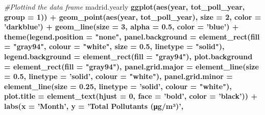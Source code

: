 \documentclass[
]{article}
\newenvironment{Shaded}{\begin{snugshade}}{\end{snugshade}}
\newcommand{\CommentTok}[1]{\textcolor[rgb]{0.56,0.35,0.01}{\textit{#1}}}
\newcommand{\DataTypeTok}[1]{\textcolor[rgb]{0.13,0.29,0.53}{#1}}
\newcommand{\DecValTok}[1]{\textcolor[rgb]{0.00,0.00,0.81}{#1}}
\newcommand{\FloatTok}[1]{\textcolor[rgb]{0.00,0.00,0.81}{#1}}
\newcommand{\KeywordTok}[1]{\textcolor[rgb]{0.13,0.29,0.53}{\textbf{#1}}}
\newcommand{\NormalTok}[1]{#1}
\newcommand{\OperatorTok}[1]{\textcolor[rgb]{0.81,0.36,0.00}{\textbf{#1}}}
\newcommand{\StringTok}[1]{\textcolor[rgb]{0.31,0.60,0.02}{#1}}
\begin{document}
\begin{Shaded}
\begin{Highlighting}[]
{{{\CommentTok{#Plottind the data frame}
\NormalTok{madrid.yearly }\OperatorTok{%>%}
\StringTok{  }\KeywordTok{ggplot}\NormalTok{(}\KeywordTok{aes}\NormalTok{(year, tot_poll_year, }\DataTypeTok{group =} \DecValTok{1}\NormalTok{)) }\OperatorTok{+}\StringTok{ }
\StringTok{    }\KeywordTok{geom_point}\NormalTok{(}\KeywordTok{aes}\NormalTok{(year, tot_poll_year), }\DataTypeTok{size =} \DecValTok{2}\NormalTok{, }\DataTypeTok{color =} \StringTok{'darkblue'}\NormalTok{) }\OperatorTok{+}\StringTok{ }
\StringTok{    }\KeywordTok{geom_line}\NormalTok{(}\DataTypeTok{size =} \DecValTok{3}\NormalTok{, }\DataTypeTok{alpha =} \FloatTok{0.5}\NormalTok{, }\DataTypeTok{color =} \StringTok{'blue'}\NormalTok{) }\OperatorTok{+}
\StringTok{    }\KeywordTok{theme}\NormalTok{(}\DataTypeTok{legend.position =} \StringTok{"none"}\NormalTok{,}
        \DataTypeTok{panel.background =} \KeywordTok{element_rect}\NormalTok{(}\DataTypeTok{fill =} \StringTok{"gray94"}\NormalTok{, }
                                        \DataTypeTok{colour =} \StringTok{"white"}\NormalTok{,}
                                        \DataTypeTok{size =} \FloatTok{0.5}\NormalTok{, }
                                        \DataTypeTok{linetype =} \StringTok{"solid"}\NormalTok{),}
        \DataTypeTok{legend.background =} \KeywordTok{element_rect}\NormalTok{(}\DataTypeTok{fill =} \StringTok{"gray94"}\NormalTok{),}
        \DataTypeTok{plot.background =} \KeywordTok{element_rect}\NormalTok{(}\DataTypeTok{fill =} \StringTok{"gray94"}\NormalTok{),}
        \DataTypeTok{panel.grid.major =} \KeywordTok{element_line}\NormalTok{(}\DataTypeTok{size =} \FloatTok{0.5}\NormalTok{, }
                                        \DataTypeTok{linetype =} \StringTok{'solid'}\NormalTok{, }
                                        \DataTypeTok{colour =} \StringTok{"white"}\NormalTok{), }
        \DataTypeTok{panel.grid.minor =} \KeywordTok{element_line}\NormalTok{(}\DataTypeTok{size =} \FloatTok{0.25}\NormalTok{, }
                                        \DataTypeTok{linetype =} \StringTok{'solid'}\NormalTok{, }
                                        \DataTypeTok{colour =} \StringTok{"white"}\NormalTok{),  }
        \DataTypeTok{plot.title =} \KeywordTok{element_text}\NormalTok{(}\DataTypeTok{hjust =} \DecValTok{0}\NormalTok{, }
                                  \DataTypeTok{face =} \StringTok{'bold'}\NormalTok{,}
                                  \DataTypeTok{color =} \StringTok{'black'}\NormalTok{)) }\OperatorTok{+}
\StringTok{  }\KeywordTok{labs}\NormalTok{(}\DataTypeTok{x =} \StringTok{'Month'}\NormalTok{, }
       \DataTypeTok{y =} \StringTok{'Total Pollutants (μg/m³)'}\NormalTok{, }
}}}}
\end{Highlighting}
\end{Shaded}
\end{document}
